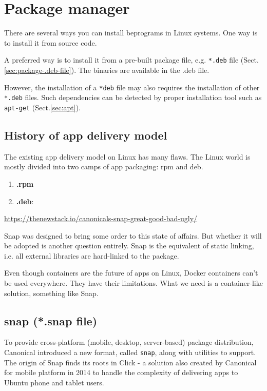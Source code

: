 \section{Package manager}
\label{sec:package-manager}

There are several ways you can install beprograms in Linux systems. One way is
to install it from source code.

A preferred way is to install it from a pre-built package file, e.g.
\verb!*.deb! file (Sect.\ref{sec:package-.deb-file}). The binaries are available
in the .deb file.

However, the installation of a \verb!*deb! file may also requires the
installation of other \verb!*.deb! files. Such dependencies can be detected by
proper installation tool such as \verb!apt-get! (Sect.\ref{sec:apt}).

\subsection{History of app delivery model}

The existing app delivery model on Linux has many flaws. The Linux world is
mostly divided into two camps of app packaging: rpm and deb.
\begin{enumerate}
  \item {\bf .rpm} 
  
  
  \item {\bf .deb}: 
\end{enumerate}
\url{https://thenewstack.io/canonicals-snap-great-good-bad-ugly/}

Snap was designed to bring some order to this state of affairs. But whether it
will be adopted is another question entirely.
Snap is the equivalent of static linking, i.e. all external libraries are
hard-linked to the package.


Even though containers are the future of apps on Linux, Docker containers can’t
be used everywhere. They have their limitations. What we need is a
container-like solution, something like Snap.


\subsection{snap (*.snap file)}
\label{sec:snap}

To provide cross-platform (mobile, desktop, server-based) package distribution,
Canonical introduced a new format, called \verb!snap!, along with utilities to
support. The origin of Snap finds its roots in Click - a solution also created
by Canonical for mobile platform in 2014 to handle the complexity of delivering
apps to Ubuntu phone and tablet users.

